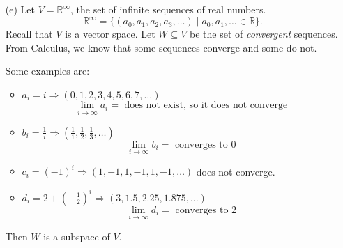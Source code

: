 \documentclass[11pt]{article}
\begin{document}
\begin{enumerate}
        \begin{proof}
            Effectively, it is sufficient to show that $X$ is a subspace of $U$.
            \begin{enumerate}
                \item[(1)] The zero function \(f(x) = 0\) is differentiable since \[f'(x) = 0 \text{ and } f'\left(\frac{1}{2}\right) = 0.\] So \(f \in X\).
                \item[(2)] Given \(f,g \in X\), we must check that \(f + g \in X\). Clearly \(f + g\) is differentiable. We must check that \((f + g)' \left( \frac{1}{2} \right) = 0.\) From Calculus, we have
                \begin{align*}
                    (f+g)'\left(\frac{1}{2}\right) &= f'\left(\frac{1}{2}\right) + g' \left(\frac{1}{2}\right) \\
                    &= 0 + 0 \\
                    &= 0.
                \end{align*}
                So we have \(f + g \in X\).
                \item[(3)] Similar proof as follows for scalar multiplication: \[ (kg)' \left(\frac{1}{2}\right) = k \cdot f' \left(\frac{1}{2}\right) = 0. \] 
            \end{enumerate}
        \end{proof}

        \item[(e)] Let \(V = \mathbb{R}^{\infty}\), the set of infinite sequences of real numbers. \[\mathbb{R}^{\infty} = \{(a_0,a_1,a_2,a_3, \dots) \mid a_0,a_1, \dots \in \mathbb{R}\}.\] Recall that $V$ is a vector space. Let $W \subseteq V$ be the set of \emph{convergent} sequences. From Calculus, we know that some sequences converge and some do not.
        
        Some examples are:
        \begin{itemize}
            \item \(a_i = i \Rightarrow (0,1,2,3,4,5,6,7, \dots)\) \[\lim_{i \to \infty} a_i =\text{ does not exist, so it does not converge}\]
            \item \(b_i = \frac{1}{i} \Rightarrow (\frac{1}{1}, \frac{1}{2}, \frac{1}{3}, \dots)\) \[ \lim_{i \to \infty} b_i = \text{ converges to 0} \]
            \item \(c_i = (-1)^i \Rightarrow (1, -1, 1, -1, 1, -1, \dots)\) does not converge.
            \item \(d_i = 2 + \left( - \frac{1}{2} \right)^i \Rightarrow (3, 1.5, 2.25, 1.875, \dots)\) \[\lim_{i \to \infty} d_i = \text{ converges to 2}\]
        \end{itemize}
        Then $W$ is a subspace of $V$.


\end{enumerate}
\end{document}
